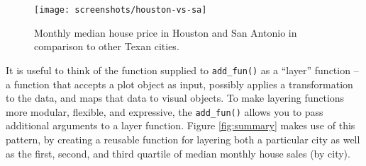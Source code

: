 \documentclass[12pt,]{isuthesis}
\newenvironment{Shaded}{\begin{snugshade}}{\end{snugshade}}
\newcommand{\KeywordTok}[1]{\textcolor[rgb]{0.13,0.29,0.53}{\textbf{{#1}}}}
\newcommand{\DataTypeTok}[1]{\textcolor[rgb]{0.13,0.29,0.53}{{#1}}}
\newcommand{\FloatTok}[1]{\textcolor[rgb]{0.00,0.00,0.81}{{#1}}}
\newcommand{\StringTok}[1]{\textcolor[rgb]{0.31,0.60,0.02}{{#1}}}
\newcommand{\CommentTok}[1]{\textcolor[rgb]{0.56,0.35,0.01}{\textit{{#1}}}}
\newcommand{\OtherTok}[1]{\textcolor[rgb]{0.56,0.35,0.01}{{#1}}}
\newcommand{\NormalTok}[1]{{#1}}
\begin{document}
\begin{figure}
\centering
\texttt{[image: screenshots/houston-vs-sa]}
\caption{\label{fig:houston-vs-sa}Monthly median house price in Houston and
San Antonio in comparison to other Texan cities.}
\end{figure}

It is useful to think of the function supplied to \texttt{add\_fun()} as
a ``layer'' function -- a function that accepts a plot object as input,
possibly applies a transformation to the data, and maps that data to
visual objects. To make layering functions more modular, flexible, and
expressive, the \texttt{add\_fun()} allows you to pass additional
arguments to a layer function. Figure \ref{fig:summary} makes use of
this pattern, by creating a reusable function for layering both a
particular city as well as the first, second, and third quartile of
median monthly house sales (by city).

\begin{Shaded}
\end{Shaded}
\end{document}
